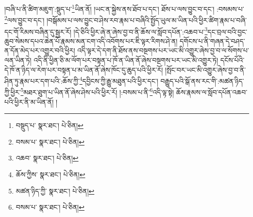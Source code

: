 །བཞི་པ་ནི་ཚིག་མཇུག་:སྡུད་པ་\footnote{བསྡུད་པ་  སྣར་ཐང་།  པེ་ཅིན། }ཡིན་ནོ། །ཡང་ན་སྐྱེས་ནས་ཐོབ་པ་དང་། ཐོས་པ་ལས་བྱུང་བ་དང་། :བསམས་པ་\footnote{བསམ་པ་  སྣར་ཐང་།  པེ་ཅིན། }ལས་བྱུང་བ་དང་། །བསྒོམས་པ་ལས་བྱུང་བ་ཤེས་རབ་རྣམ་པ་བཞིའི་སྤྱོད་ཡུལ་མ་ཡིན་པའི་ཕྱིར་ཚིག་རྣམ་པ་བཞི་དང་གོ་རིམས་བཞིན་དུ་སྦྱར་རོ། །དེ་ཅིའི་ཕྱིར་ཞེ་ན་ཞེས་བྱ་བ་ནི་ཆོས་ལ་སློབ་དཔོན་:འཆབ་པ་\footnote{འཆབ་  སྣར་ཐང་།  པེ་ཅིན། }དང་བྲལ་བའི་བྱང་ཆུབ་སེམས་དཔའ་ཆེན་པོ་རྣམས་མན་ངག་འདི་འབོགས་པར་ཇི་ལྟར་རིགས་ཤེ་ན། དགོངས་པ་ནི་གཞན་དེ་བཤད་ན་དོན་མེད་པར་འགྱུར་བའི་ཕྱིར། འདི་ལྟར་དེ་དག་ནི་ཐོས་ནས་བསྔགས་པར་ཡང་མི་འགྱུར་ཞེས་བྱ་བ་ལ་སོགས་པ་ལན་ཡིན་ཏེ། འདི་ནི་ཕྱིན་ཅི་མ་ལོག་པར་བསྟན་པ་ཁོ་ན་ཡིན་ནོ་ཞེས་བསྔགས་པར་ཡང་མི་འགྱུར་ཏེ། དངོས་པོའི་དེ་ཁོ་ན་ཉིད་ལ་རེག་པར་བསྟན་པ་མ་ཡིན་ནོ་ཞེས་ཁོང་དུ་ཆུད་པའི་ཕྱིར་རོ། །སྤོང་བར་ཡང་མི་འགྱུར་ཞེས་བྱ་བ་ནི་ཤིན་ཏུ་རྣམ་པར་དག་པའི་:ཆོས་ཀྱི་\footnote{ཆོས་ཀྱིས་  སྣར་ཐང་།  པེ་ཅིན། }དབྱིངས་ཀྱི་རྒྱུ་མཐུན་པའི་ཕྱིར་དང་། བརྒྱུད་པའི་སྒོ་ནས་རང་གི་:མཚན་ཉིད་ཀྱི་ཕྱིར་\footnote{མཚན་ཉིད་ཀྱི་  སྣར་ཐང་།  པེ་ཅིན། }མཐར་ཐུག་པ་ཡིན་ནོ་ཞེས་ཤེས་པའི་ཕྱིར་རོ། །:བསམ་པ་ནི་\footnote{བསམ་པ་  སྣར་ཐང་།  པེ་ཅིན། }འདི་ལྟ་སྟེ། ཆོས་རྣམས་ལ་སློབ་དཔོན་འཆབ་པའི་ཕྱིར་ནི་མ་ཡིན་ནོ། །
